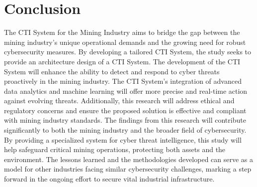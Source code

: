 \documentclass[a4paper,twoside,12pt]{report}
\begin{document}
  
\chapter{Conclusion}
The CTI System for the Mining Industry aims to bridge the gap between the mining industry's unique operational demands and the growing need for robust cybersecurity measures. By developing a tailored CTI System, the study seeks to provide an architecture design of a CTI System. The development of the CTI System will enhance the ability to detect and respond to cyber threats proactively in the mining industry. The CTI System's integration of advanced data analytics and machine learning will offer more precise and real-time action against evolving threats. Additionally, this research will address ethical and regulatory concerns and ensure the proposed solution is effective and compliant with mining industry standards.
The findings from this research will contribute significantly to both the mining industry and the broader field of cybersecurity. By providing a specialized system for cyber threat intelligence, this study will help safeguard critical mining operations, protecting both assets and the environment. The lessons learned and the methodologies developed can serve as a model for other industries facing similar cybersecurity challenges, marking a step forward in the ongoing effort to secure vital industrial infrastructure.







\end{document}
